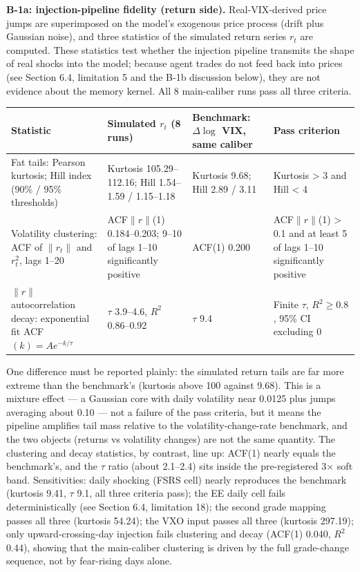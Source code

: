 \documentclass[11pt]{article}
\begin{document}
\textbf{B-1a: injection-pipeline fidelity (return side).} Real-VIX-derived price jumps are superimposed on the model's exogenous price process (drift plus Gaussian noise), and three statistics of the simulated return series $r_t$ are computed. These statistics test whether the injection pipeline transmits the shape of real shocks into the model; because agent trades do not feed back into prices (see Section 6.4, limitation 5 and the B-1b discussion below), they are not evidence about the memory kernel. All 8 main-caliber runs pass all three criteria.

\begin{table}[htbp]
\centering
\begin{tabular}{llll}
\toprule
\textbf{Statistic} & \textbf{Simulated $r_t$ (8 runs)} & \textbf{Benchmark: $\Delta\log$ VIX, same caliber} & \textbf{Pass criterion} \\
\midrule
Fat tails: Pearson kurtosis; Hill index (90\% / 95\% thresholds) & Kurtosis 105.29--112.16; Hill 1.54--1.59 / 1.15--1.18 & Kurtosis 9.68; Hill 2.89 / 3.11 & Kurtosis > 3 and Hill < 4 \\
Volatility clustering: ACF of $\|r_t\|$ and $r_t^2$, lags 1--20 & ACF$\|r\|$(1) 0.184--0.203; 9--10 of lags 1--10 significantly positive & ACF(1) 0.200 & ACF$\|r\|$(1) > 0.1 and at least 5 of lags 1--10 significantly positive \\
$\|r\|$ autocorrelation decay: exponential fit ACF$(k) = A e^{-k/\tau}$ & $\tau$ 3.9--4.6, $R^2$ 0.86--0.92 & $\tau$ 9.4 & Finite $\tau$, $R^2 \geq 0.8$, 95\% CI excluding 0 \\
\bottomrule
\end{tabular}
\end{table}

One difference must be reported plainly: the simulated return tails are far more extreme than the benchmark's (kurtosis above 100 against 9.68). This is a mixture effect --- a Gaussian core with daily volatility near 0.0125 plus jumps averaging about 0.10 --- not a failure of the pass criteria, but it means the pipeline amplifies tail mass relative to the volatility-change-rate benchmark, and the two objects (returns vs volatility changes) are not the same quantity. The clustering and decay statistics, by contrast, line up: ACF(1) nearly equals the benchmark's, and the $\tau$ ratio (about 2.1--2.4) sits inside the pre-registered 3$\times$ soft band. Sensitivities: daily shocking (FSRS cell) nearly reproduces the benchmark (kurtosis 9.41, $\tau$ 9.1, all three criteria pass); the EE daily cell fails deterministically (see Section 6.4, limitation 18); the second grade mapping passes all three (kurtosis 54.24); the VXO input passes all three (kurtosis 297.19); only upward-crossing-day injection fails clustering and decay (ACF(1) 0.040, $R^2$ 0.44), showing that the main-caliber clustering is driven by the full grade-change sequence, not by fear-rising days alone.
\end{document}
